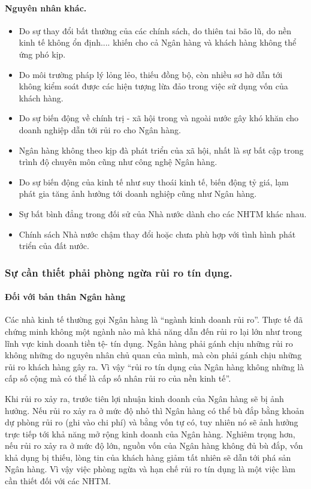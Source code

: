 \paragraph{Nguyên nhân khác.}

\begin{itemize}
\item Do sự thay đổi bất thường của các chính sách, do thiên tai bão lũ, do nền kinh tế không ổn định.... khiến cho cả Ngân hàng và khách hàng không thể ứng phó kịp.
\item Do môi trường pháp lý lỏng lẻo, thiếu đồng bộ, còn nhiều sơ hở dẫn tới không kiểm soát được các hiện tượng lừa đảo trong việc sử dụng vốn của khách hàng.
\item Do sự biến động về chính trị - xã hội trong và ngoài nước gây khó khăn cho doanh nghiệp dẫn tới rủi ro cho Ngân hàng.
\item Ngân hàng không theo kịp đà phát triển của xã hội, nhất là sự bất cập trong trình độ chuyên môn cũng như công nghệ Ngân hàng.
\item Do sự biến động của kinh tế như suy thoái kinh tế, biến động tỷ giá, lạm phát gia tăng ảnh hưởng tới doanh nghiệp cũng như Ngân hàng.
\item Sự bất bình đẳng trong đối sử của Nhà nước dành cho các NHTM khác nhau.
\item Chính sách Nhà nước chậm thay đổi hoặc chưa phù hợp với tình hình phát triển của đất nước.
\end{itemize}

\subsubsection{Sự cần thiết phải phòng ngừa rủi ro tín dụng.}

\paragraph{Đối với bản thân Ngân hàng}
Các nhà kinh tế thường gọi Ngân hàng là “ngành kinh doanh rủi ro”. Thực tế đã chứng minh không một ngành nào mà khả năng dẫn đến rủi ro lại lớn như trong lĩnh vực kinh doanh tiền tệ- tín dụng. Ngân hàng phải gánh chịu những rủi ro không những do nguyên nhân chủ quan của mình, mà còn phải gánh chịu những rủi ro khách hàng gây ra. Vì vậy “rủi ro tín dụng của Ngân hàng không những là cấp số cộng mà có thể là cấp số nhân rủi ro của nền kinh tế”.

Khi rủi ro xảy ra, trước tiên lợi nhuận kinh doanh của Ngân hàng sẽ bị ảnh hưởng. Nếu rủi ro xảy ra ở mức độ nhỏ thì Ngân hàng có thể bù đắp bằng khoản dự phòng rủi ro (ghi vào chi phí) và bằng vốn tự có, tuy nhiên nó sẽ ảnh hưởng trực tiếp tới khả năng mở rộng kinh doanh của Ngân hàng. Nghiêm trọng hơn, nếu rủi ro xảy ra ở mức độ lớn, nguồn vốn của Ngân hàng không đủ bù đắp, vốn khả dụng bị thiếu, lòng tin của khách hàng giảm tất nhiên sẽ dẫn tới phá sản Ngân hàng. Vì vậy việc phòng ngừa và hạn chế rủi ro tín dụng là một việc làm cần thiết đối với các NHTM.

